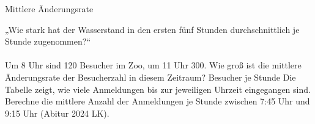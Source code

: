 \setcounter{aufgabe}{9}

\begin{aufgabe}{Mittlere Änderungsrate}
\begin{teile}
\teil „Wie stark hat der Wasserstand in den ersten fünf Stunden durchschnittlich je Stunde zugenommen?“ \\  \\ 
\teil Um 8 Uhr sind 120 Besucher im Zoo, um 11 Uhr 300. Wie groß ist die mittlere Änderungsrate der Besucherzahl in diesem Zeitraum? \leerfeld Besucher je Stunde
\teil Die Tabelle zeigt, wie viele Anmeldungen bis zur jeweiligen Uhrzeit eingegangen sind. Berechne die mittlere Anzahl der Anmeldungen je Stunde zwischen 7:45 Uhr und 9:15 Uhr \hfill (Abitur 2024 LK).


\end{teile}
\end{aufgabe}
